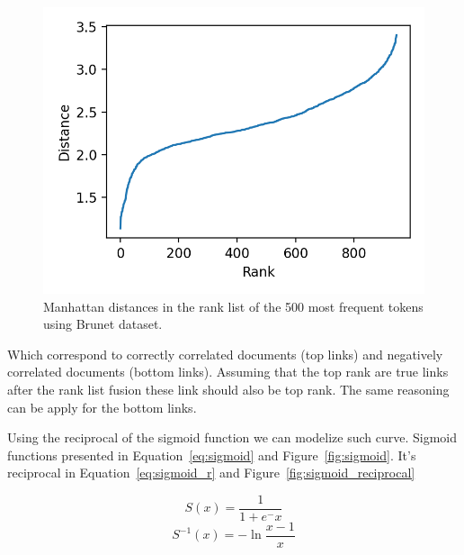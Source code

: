 \begin{figure}
  \includegraphics[width=\linewidth]{img/distance_over_rank.png}
  \caption{Manhattan distances in the rank list of the 500 most frequent tokens using Brunet dataset.}
  \label{fig:distance_over_rank}
\end{figure}

Which correspond to correctly correlated documents (top links) and negatively correlated documents (bottom links).
Assuming that the top rank are true links after the rank list fusion these link should also be top rank.
The same reasoning can be apply for the bottom links.

Using the reciprocal of the sigmoid function we can modelize such curve. Sigmoid functions presented in Equation~\ref{eq:sigmoid} and Figure~\ref{fig:sigmoid}. It's reciprocal in Equation~\ref{eq:sigmoid_r} and Figure~\ref{fig:sigmoid_reciprocal}

\begin{equation}
  \label{eq:sigmoid}
  S(x) = \frac{1}{1+e^-x}
\end{equation}
\begin{equation}
  \label{eq:sigmoid_r}
  S^{-1}(x) = -\ln{\frac{x-1}{x}}
\end{equation}

